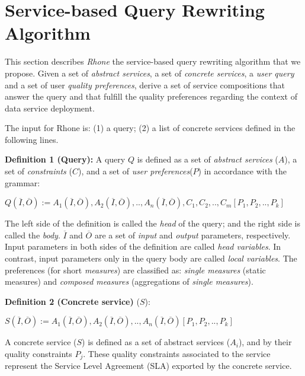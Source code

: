 \section{Service-based Query Rewriting Algorithm}
\label{sec:rhone} 
This section describes \textit{Rhone} the service-based query rewriting algorithm that we propose. Given
a set of \textit{abstract services}, a set of \textit{concrete services}, a
\textit{user query} and a set of user \textit{quality preferences}, derive a set
of service compositions that answer the query and that fulfill the quality preferences
 regarding the context of data service deployment.

The  input for  Rhone  is: (1) a query; (2) a list of concrete services defined in the following lines.

\noindent \textbf{Definition 1 (Query):} 
A query $Q$ is defined as a set of \textit{abstract services} ($A$), a set of \textit{constraints} ($C$), and a set of \textit{user preferences}($P$) in accordance with the grammar: 

\begin{center}
$Q (\overline{I}, \overline{O}) := A_{1}(\overline{I}, \overline{O}), A_{2}(\overline{I}, \overline{O}), ..,  A_{n}(\overline{I}, \overline{O}),C_{1},C_{2}, .., C_{m}[P_{1},P_{2}, .., P_{k}]$
\end{center}  

The left side of the definition is called the \textit{head} of the query; and the right side is called the \textit{body}. 
$\overline{I}$ and $\overline{O}$ are a set of \textit{input} and \textit{output} parameters, respectively.
Input parameters in both sides of the definition are called \textit{head variables}.
In contrast, input parameters only in the query body are called \textit{local variables}.
The preferences (for short \textit{measures}) are classified as: \textit{single measures} (static measures) and \textit{composed measures} (aggregations of \textit{single measures}).
%

\noindent \textbf{Definition 2 (Concrete service)}  ($S$):
\begin{center}
$S (\overline{I}, \overline{O}) := A_{1}(\overline{I}, \overline{O}), A_{2}(\overline{I}, \overline{O}), ..,  A_{n}(\overline{I}, \overline{O})[P_{1},P_{2}, .., P_{k}]$
\end{center}  

A concrete service ($S$) is defined as a set of abstract services ($A_{i}$), and by their quality constraints $P_{j}$. 
These quality constraints associated to the service represent the Service Level Agreement (SLA) exported by the concrete service.


